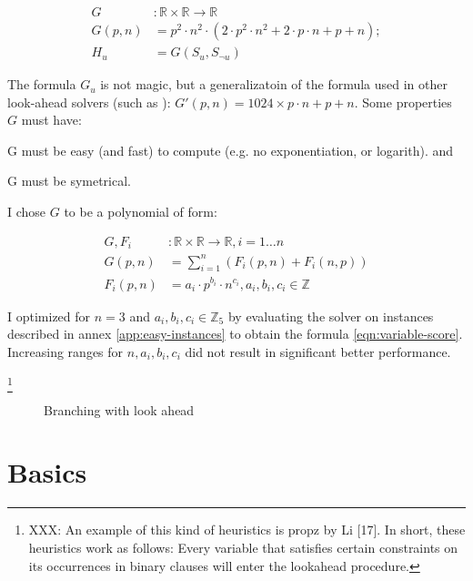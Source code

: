 \begin{align}
  G &: \mathbb{R} \times \mathbb{R} \rightarrow \mathbb{R} \\
  \label{eqn:variable-score}
  G(p, n) &=  p^2 \cdot n^2 \cdot (2 \cdot p^2 \cdot n^2 + 2 \cdot p \cdot n + p + n); \\
  H_u &= G(S_u, S_{\neg u})
\end{align}


The formula $G_u$ is not magic, but a generalizatoin of the formula
used in other look-ahead solvers (such as \cite{mine:march}): $G'(p,
n) = 1024 \times p \cdot n + p + n$. Some properties $G$ must have:
\begin{inparaenum}
\item G must be easy (and fast) to compute (e.g. no exponentiation, or
logarith). and
\item G must be symetrical.
\end{inparaenum} I chose $G$ to be a polynomial of form:

\begin{align}
  G, F_i &: \mathbb{R} \times \mathbb{R} \rightarrow \mathbb{R}, i = 1 \ldots n \\
  G(p, n) &= \sum_{i=1}^{n}{(F_i(p, n) + F_i(n, p))} \\
  F_i(p, n) &= a_i \cdot p^{b_i} \cdot n^{c_i}, a_i, b_i, c_i \in \mathbb{Z}
\end{align}

I optimized for $n = 3$ and $a_i, b_i, c_i \in \mathbb{Z}_5$ by evaluating
the solver on instances described in annex \ref{app:easy-instances}
to obtain the formula \ref{eqn:variable-score}. Increasing ranges for
$n, a_i, b_i, c_i$ did not result in significant better performance.


\footnote{XXX: An example of this kind of heuristics is propz by Li
[17]. In short, these heuristics work as follows: Every variable
that satisfies certain constraints on its occurrences in binary
clauses will enter the lookahead procedure.}


\begin{figure}[h]
  \centering
  \caption{Branching with look ahead}
  \label{fig:branching}
\end{figure}

\section{Basics}

